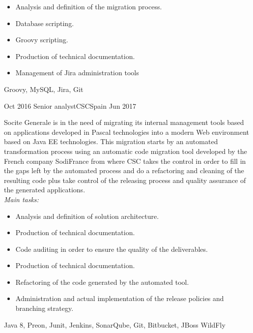 \begin{experiences}
{                      \begin{itemize}
                        \item Analysis and definition of the migration process.
                        \item Database scripting.
                        \item Groovy scripting.
                        \item Production of technical documentation.
                        \item Management of Jira administration tools
                      \end{itemize}
                    }
                    {Groovy, MySQL, Jira, Git}
                    
  \emptySeparator
  
    \experience
    {Oct 2016} {Senior analyst}{CSC}{Spain}
    {Jun 2017}    {

Socite Generale is in the need of migrating its internal management tools based on applications
developed in Pascal technologies into a modern Web environment based on Java EE
technologies. This migration starts by an automated transformation process using an automatic
code migration tool developed by the French company SodiFrance from where CSC takes the
control in order to fill in the gaps left by the automated process and do a refactoring and
cleaning of the resulting code plus take control of the releasing process and quality assurance of the generated applications.
\\
\emph{Main tasks:}
    	
                      \begin{itemize}
                        \item Analysis and definition of solution architecture.
                        \item Production of technical documentation.
                        \item Code auditing in order to ensure the quality of the deliverables.
                        \item Production of technical documentation.
                        \item Refactoring of the code generated by the automated tool.
                        \item Administration and actual implementation of the release policies and branching strategy.
                      \end{itemize}
                    }
                    {Java 8, Preon, Junit, Jenkins, SonarQube, Git, Bitbucket, JBoss
WildFly}
                    

\end{experiences}
